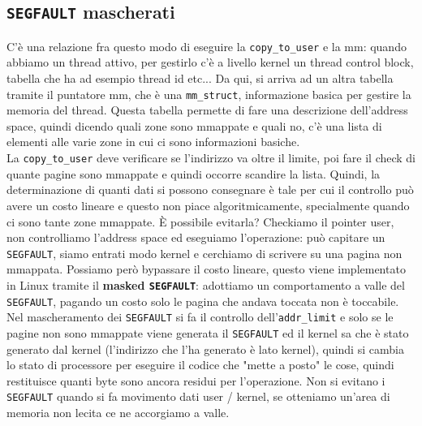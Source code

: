 \documentclass[12pt, oneside]{extbook}
\begin{document}
\subsection{\texttt{SEGFAULT} mascherati}
C'è una relazione fra questo modo di eseguire la \texttt{copy\_to\_user} e la mm: quando abbiamo un thread attivo, per gestirlo c'è a livello kernel un thread control block, tabella che ha ad esempio thread id etc... Da qui, si arriva ad un altra tabella tramite il puntatore mm, che è una \texttt{mm\_struct}, informazione basica per gestire la memoria del thread. Questa tabella permette di fare una descrizione dell'address space, quindi dicendo quali zone sono mmappate e quali no, c'è una lista di elementi alle varie zone in cui ci sono informazioni basiche.\\La \texttt{copy\_to\_user} deve verificare se l'indirizzo va oltre il limite, poi fare il check di quante pagine sono mmappate e quindi occorre scandire la lista. Quindi, la determinazione di quanti dati si possono consegnare è tale per cui il controllo può avere un costo lineare e questo non piace algoritmicamente, specialmente quando ci sono tante zone mmappate. È possibile evitarla? Checkiamo il pointer user, non controlliamo l'address space ed eseguiamo l'operazione: può capitare un \texttt{SEGFAULT}, siamo entrati modo kernel e cerchiamo di scrivere su una pagina non mmappata. Possiamo però bypassare il costo lineare, questo viene implementato in Linux tramite il \textbf{masked \texttt{SEGFAULT}}: adottiamo un comportamento a valle del \texttt{SEGFAULT}, pagando un costo solo le pagina che andava toccata non è toccabile. Nel mascheramento dei \texttt{SEGFAULT} si fa il controllo dell'\texttt{addr\_limit} e solo se le pagine non sono mmappate viene generata il \texttt{SEGFAULT} ed il kernel sa che è stato generato dal kernel (l'indirizzo che l'ha generato è lato kernel), quindi si cambia lo stato di processore per eseguire il codice che "mette a posto" le cose, quindi restituisce quanti byte sono ancora residui per l'operazione. Non si evitano i \texttt{SEGFAULT} quando si fa movimento dati user / kernel, se otteniamo un'area di memoria non lecita ce ne accorgiamo a valle.
\end{document}
